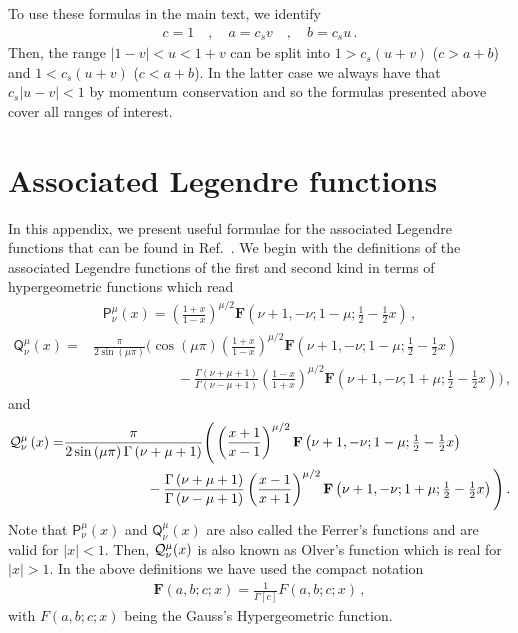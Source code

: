 \documentclass[a4paper,11pt]{article}
\numberwithin{equation}{section}
\begin{document}
To use these formulas in the main text, we identify
\begin{align}
c=1\quad,\quad a=c_sv\quad,\quad b=c_su\,.
\end{align}
Then, the range $|1-v|<u<1+v$ can be split into $1>c_s(u+v)$ ($c>a+b$) and $1<c_s(u+v)$ ($c<a+b$). In the latter case we always have that $c_s|u-v|<1$ by momentum conservation and so the formulas presented above cover all ranges of interest. 


\section{Associated Legendre functions \label{app:legendre}}
In this appendix, we present useful formulae for the associated Legendre functions that can be found in Ref.~\cite{NIST:DLMF}. We begin with the definitions of the associated Legendre functions of the first and second kind in terms of hypergeometric functions which read
\begin{align}
\mathsf{P}^{\mu}_{\nu}\left(x\right)=\left(\frac{1+x}{1-x}\right)^{\mu/2}%
\mathbf{F}\left(\nu+1,-\nu;1-\mu;\tfrac{1}{2}-\tfrac{1}{2}x\right)\,,
\end{align}
\begin{align}
\mathsf{Q}^{\mu}_{\nu}\left(x\right)=&\frac{\pi}{2\sin\left(\mu\pi\right)}\Bigg%
(\cos\left(\mu\pi\right)\left(\frac{1+x}{1-x}\right)^{\mu/2}\mathbf{F}\left(%
\nu+1,-\nu;1-\mu;\tfrac{1}{2}-\tfrac{1}{2}x\right)\nonumber\\&\qquad\qquad\qquad-\frac{\Gamma\left(\nu+\mu+1%
\right)}{\Gamma\left(\nu-\mu+1\right)}\left(\frac{1-x}{1+x}\right)^{\mu/2}%
\mathbf{F}\left(\nu+1,-\nu;1+\mu;\tfrac{1}{2}-\tfrac{1}{2}x\right)\Bigg)\,,
\end{align}
and
\begin{align}
{\cal Q}^{\mu}_{\nu}\left(x\right)=&%
\frac{\pi}{2\sin\left(\mu\pi\right)\Gamma\left(\nu+\mu+1\right)}\Bigg(\left(\frac{x+1}{x-1}\right)^{\mu/2}\mathbf{F}\left%
(\nu+1,-\nu;1-\mu;\tfrac{1}{2}-\tfrac{1}{2}x\right)\nonumber\\&\qquad\qquad\qquad-\frac{\Gamma\left(\nu+\mu+1\right)}{%
\Gamma\left(\nu-\mu+1\right)}\left(\frac{x-1}{x+1}\right)^{\mu/2}\mathbf{F}\left(\nu+1,-\nu;1+\mu;%
\tfrac{1}{2}-\tfrac{1}{2}x\right)\Bigg)\,.
\end{align}
Note that $\mathsf{P}^{\mu}_{\nu}(x)$ and  $\mathsf{Q}^{\mu}_{\nu}(x)$ are also called the Ferrer's functions and are valid for $|x|<1$. Then, ${\cal Q}^{\mu}_{\nu}(x)$ is also known as Olver's function which is real for $|x|>1$. In the above definitions we have used the compact notation
\begin{align}
\mathbf{F}\left(a,b;c;x\right)=\frac{1}{\Gamma[c]}{F}\left(a,b;c;x\right)\,,
\end{align}
with ${F}\left(a,b;c;x\right)$ being the Gauss's Hypergeometric function.
\end{document}
